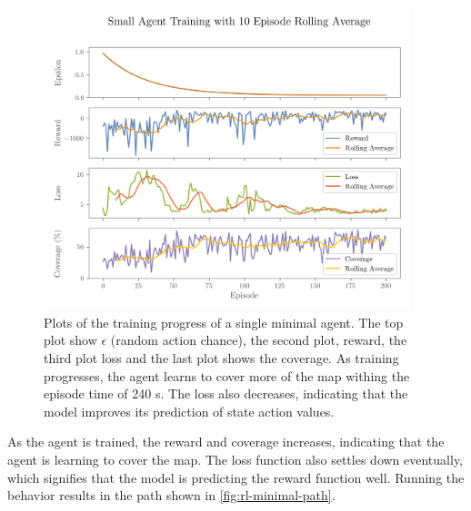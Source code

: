 \begin{figure}[H]
    \centering
    \includegraphics[width=0.95\textwidth]{figures/rl/small-search-agent-training.png}
    \caption{Plots of the training progress of a single minimal agent. The top plot show $\epsilon$ (random action chance), the second plot, reward, the third plot loss and the last plot shows the coverage. As training progresses, the agent learns to cover more of the map withing the episode time of 240 s. The loss also decreases, indicating that the model improves its prediction of state action values.}
    \label{fig:rl-minimal-training}
\end{figure}

As the agent is trained, the reward and coverage increases, indicating that the agent is learning to cover the map. The loss function also settles down eventually, which signifies that the model is predicting the reward function well. Running the behavior results in the path shown in \cref{fig:rl-minimal-path}.

